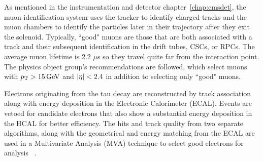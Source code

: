 As mentioned in the instrumentation and detector chapter~\ref{chap:cmsdet}, the muon identification system uses the tracker to identify charged tracks and the muon chambers to identify the particles later in their trajectory after they exit the solenoid. Typically, ``good" muons are those that are both associated with a track and their subsequent identification in the drift tubes, CSCs, or RPCs. The average muon lifetime is 2.2 $\mu$s so they travel quite far from the interaction point.  The physics object group's recommendations are followed, which select muons with $p_{\mathrm{T}}>15\,\text{Ge\hspace{-.08em}V}$ and $\lvert \eta \rvert<2.4$ in addition to selecting only ``good" muons.

Electrons originating from the tau decay are reconstructed by track association along with energy deposition in the Electronic Calorimeter (ECAL). Events are vetoed for candidate electrons that also show a substantial energy deposition in the HCAL for better efficiency. The hits and track quality from two separate algorithms, along with the geometrical and energy matching from the ECAL are used in a Multivariate Analysis (MVA) technique to select good electrons for analysis 
~\cite{Khachatryan:2015hwa}.

